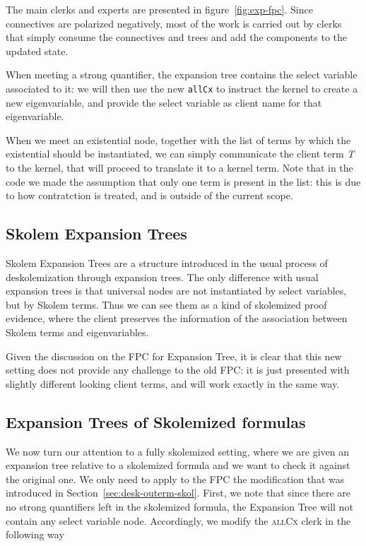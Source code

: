 \documentclass[a4paper,USenglish]{lipics-v2018}
\begin{document}
{The main clerks and experts are presented in
figure~\ref{fig:exp-fpc}. Since connectives are polarized negatively,
most of the work is carried out by clerks that simply consume the
connectives and trees and add the components to the updated state.

When meeting a strong quantifier, the expansion tree contains the
select variable associated to it: we will then use the new
\texttt{allCx} to instruct the kernel to create a new eigenvariable,
and provide the select variable as client name for that eigenvariable.

When we meet an existential node, together with the list of terms by
which the existential should be instantiated, we can simply
communicate the client term \emph{T} to the kernel, that will proceed
to translate it to a kernel term. Note that in the code we made the
assumption that only one term is present in the list: this is due to
how contratction is treated, and is outside of the current scope.

\subsection{Skolem Expansion Trees}
Skolem Expansion Trees are a structure introduced in the usual process
of deskolemization through expansion trees. The only difference with
usual expansion trees is that universal nodes are not instantiated by
select variables, but by Skolem terms.
%
Thus we can see them as a kind of skolemized proof evidence, where the
client preserves the information of the association between Skolem
terms and eigenvariables.

Given the discussion on the FPC for Expansion Tree, it is clear that
this new setting does not provide any challenge to the old FPC: it is
just presented with slightly different looking client terms, and will
work exactly in the same way.

\subsection{Expansion Trees of Skolemized formulas}
We now turn our attention to a fully skolemized setting, where we are
given an expansion tree relative to a skolemized formula and we want
to check it against the original one.
%
We only need to apply to the FPC the modification that was introduced
in Section~\ref{sec:desk-outerm-skol}. First, we note that since there
are no strong quantifiers left in the skolemized formula, the
Expansion Tree will not contain any select variable node.
%
Accordingly, we modify the \textsc{allCx} clerk in the following way

}
\end{document}

